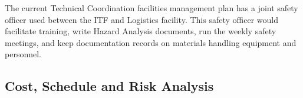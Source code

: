 The current Technical Coordination facilities management plan has a joint safety officer used between the ITF and Logistics facility. This safety officer would facilitate training, write Hazard Analysis documents, run the weekly safety meetings, and keep documentation records on materials handling equipment and personnel. 


\subsection{Cost, Schedule and Risk Analysis}
\label{sec:fdsp-tc-itf-cost}

